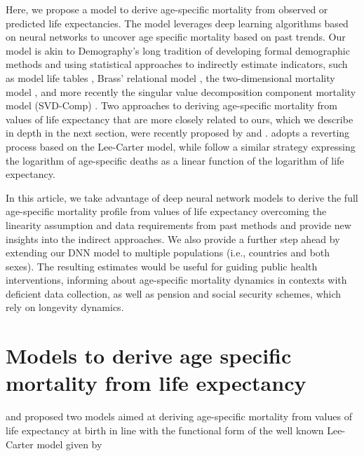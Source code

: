 \documentclass[a4,11pt]{article}
\begin{document}
Here, we propose a model to derive age-specific mortality from observed or predicted life expectancies. The model leverages deep learning algorithms based on neural networks to uncover age specific mortality based on past trends. Our model is akin to Demography's long tradition of developing formal demographic methods and using statistical approaches to indirectly estimate indicators, such as model life tables \citep{UN_1955,UN_1967,murray2003}, Brass’ relational model \citep{brass1968,brass1971}, the two-dimensional mortality model \citep{wilmoth2012}, and more recently the singular value decomposition component mortality model (SVD-Comp) \citep{clark2019GeneralAgeSpecificMortality}. Two approaches to deriving age-specific mortality from values of life expectancy that are more closely related to ours, which we describe in depth in the next section, were recently proposed by \cite{Sevcikova} and \cite{PascariuLL}. \cite{Sevcikova} adopts a reverting process based on the Lee-Carter model, while \cite{PascariuLL} follow a similar strategy expressing the logarithm of age-specific deaths as a linear function of the logarithm of life expectancy. 

In this article, we take advantage of deep neural network models to derive the full age-specific mortality profile from values of life expectancy overcoming the linearity assumption and data requirements from past methods and provide new insights into the indirect approaches. We also provide a further step ahead by extending our DNN model to multiple populations (i.e., countries and both sexes). The resulting estimates would be useful for guiding public health interventions, informing about age-specific mortality dynamics in contexts with deficient data collection, as well as pension and social security schemes, which rely on longevity dynamics. 


\section{Models to derive age specific mortality from life expectancy}

 \cite{Sevcikova} and \cite{PascariuLL} proposed two models aimed at deriving age-specific mortality from values of life expectancy at birth in line with the functional form of the well known Lee-Carter model \citep{LC1992} given by 
 
\end{document}
